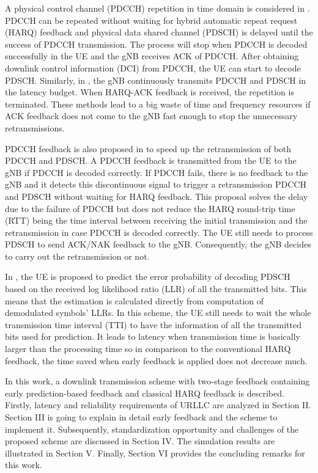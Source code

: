 \documentclass[conference]{IEEEtran}
\begin{document}
A physical control channel (PDCCH) repetition in time domain is considered in \cite{b1}. PDCCH can be repeated without waiting for hybrid automatic repeat request (HARQ) feedback and physical data shared channel (PDSCH) is delayed until the success of PDCCH transmission. The process will stop when PDCCH is decoded successfully in the UE and the gNB receives ACK of PDCCH. After obtaining downlink control information (DCI) from PDCCH, the UE can start to decode PDSCH. Similarly, in \cite{b5}, the gNB continuously transmits PDCCH and PDSCH in the latency budget. When HARQ-ACK feedback is received, the repetition is terminated. These methods lead to a big waste of time and frequency resources if ACK feedback does not come to the gNB fast enough to stop the unnecessary retransmissions. 

PDCCH feedback is also proposed in \cite{b4} to speed up the retransmission of both PDCCH and PDSCH. A PDCCH feedback is transmitted from the UE to the gNB if PDCCH is decoded correctly. If PDCCH fails, there is no feedback to the gNB and it detects this discontinuous signal to trigger a retransmission PDCCH and PDSCH without waiting for HARQ feedback. This proposal solves the delay due to the failure of PDCCH but does not reduce the HARQ round-trip time (RTT) being the time interval between receiving the initial transmission and the retransmission in case PDCCH is decoded correctly. The UE still needs to process PDSCH to send ACK/NAK feedback to the gNB. Consequently, the gNB decides to carry out the retransmission or not.

In \cite{b2}, the UE is proposed to predict the error probability of decoding PDSCH based on the received log likelihood ratio (LLR) of all the transmitted bits. This means that the estimation is calculated directly from computation of demodulated symbols' LLRs. In this scheme, the UE still needs to wait the whole transmission time interval (TTI) to have the information of all the transmitted bits used for prediction. It leads to latency when transmission time is basically larger than the processing time so in comparison to the conventional HARQ feedback, the time saved when early feedback is applied does not decrease much.

In this work, a downlink transmission scheme with two-stage feedback containing early prediction-based feedback and classical HARQ feedback is described. Firstly, latency and reliability requirements of URLLC are analyzed in Section II. Section III is going to explain in detail early feedback and the scheme to implement it. Subsequently, standardization opportunity and challenges of the proposed scheme are discussed in Section IV. The simulation results are illustrated in Section V. Finally, Section VI provides the concluding remarks for this work.
\end{document}
